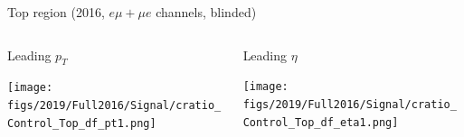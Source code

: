 \documentclass[9pt]{beamer}
\begin{document}


\begin{frame}{Top region (2016, $e \mu + \mu e$ channels, blinded)}
\justifying
\begin{columns}
		\hspace{5pt}
		\begin{column}{0.32\textwidth}
			\begin{center}
				\begin{block}{\centering Leading $p_T$}\end{block}	
     			\texttt{[image: figs/2019/Full2016/Signal/cratio\_Control\_Top\_df\_pt1.png]}
    		\end{center}		
		\end{column} \hfill
		\begin{column}{0.32\textwidth}
			\begin{center}
				\begin{block}{\centering Leading $\eta$}\end{block}	
     			\texttt{[image: figs/2019/Full2016/Signal/cratio\_Control\_Top\_df\_eta1.png]}
    		\end{center}		
		\end{column} \hfill

\end{columns}
\end{frame}
\end{document}
